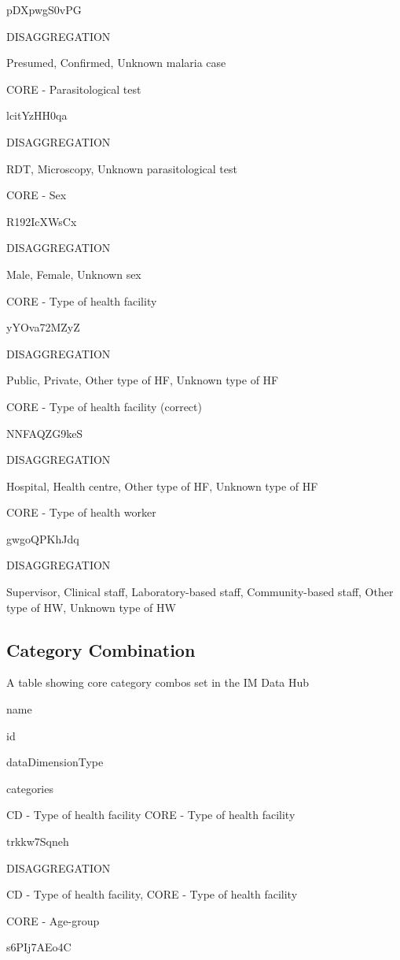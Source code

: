 \documentclass[]{book}
\begin{document}
pDXpwgS0vPG

DISAGGREGATION

Presumed, Confirmed, Unknown malaria case

CORE - Parasitological test

lcitYzHH0qa

DISAGGREGATION

RDT, Microscopy, Unknown parasitological test

CORE - Sex

R192IcXWsCx

DISAGGREGATION

Male, Female, Unknown sex

CORE - Type of health facility

yYOva72MZyZ

DISAGGREGATION

Public, Private, Other type of HF, Unknown type of HF

CORE - Type of health facility (correct)

NNFAQZG9keS

DISAGGREGATION

Hospital, Health centre, Other type of HF, Unknown type of HF

CORE - Type of health worker

gwgoQPKhJdq

DISAGGREGATION

Supervisor, Clinical staff, Laboratory-based staff, Community-based staff, Other type of HW, Unknown type of HW

\hypertarget{category-combination}{%
\subsection{Category Combination}\label{category-combination}}

\label{tab:unnamed-chunk-16}A table showing core category combos set in the IM Data Hub

name

id

dataDimensionType

categories

CD - Type of health facility \textbar{} CORE - Type of health facility

trkkw7Sqneh

DISAGGREGATION

CD - Type of health facility, CORE - Type of health facility

CORE - Age-group

s6PIj7AEo4C
\end{document}

